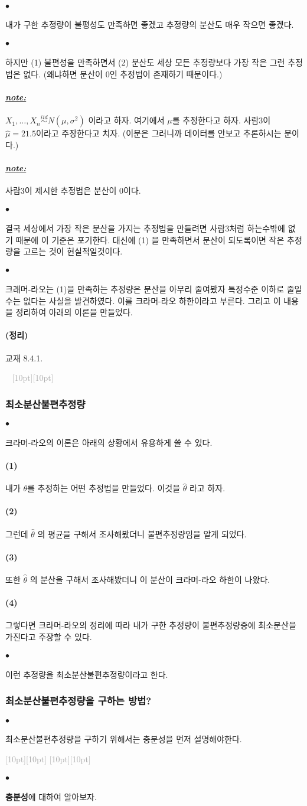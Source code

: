 \documentclass[12pt,oneside,english]{book}
\newcommand{\dash}{\vspace{2em}\noindent \textcolor{darkgray}{\hrulefill~ \raisebox{-2.5pt}[10pt][10pt]{\leafright \decofourleft \decothreeleft  \aldineright \decotwo \floweroneleft \decoone   \floweroneright \decotwo \aldineleft\decothreeright \decofourright \leafleft} ~  \hrulefill \\ \vspace{2em}}}
\newcommand{\rdash}{\noindent \textcolor{darkgray}{ \raisebox{-1.9pt}[10pt][10pt]{\leafright} \hrulefill \raisebox{-1.9pt}[10pt][10pt]{\leafright \decofourleft \decothreeleft  \aldineright \decotwo \floweroneleft \decoone}}}
\def\ck{\paragraph{\Large$\bullet$}\Large}
\def\thm{\paragraph{\Large(정리)}\Large}
\def\note{\paragraph{\Large\textit{\underline{note:}}}\Large}
\def\one{\paragraph{\Large(1)}\Large}
\def\two{\paragraph{\Large(2)}\Large}
\def\three{\paragraph{\Large(3)}\Large}
\def\four{\paragraph{\Large(4)}\Large}
\begin{document}
\ck 내가 구한 추정량이 불평성도 만족하면 좋겠고 추정량의 분산도 매우 작으면 좋겠다. 

\ck 하지만 (1) 불편성을 만족하면서 (2) 분산도 세상 모든 추정량보다 가장 작은 그런 추정법은 없다. (왜냐하면 분산이 0인 추정법이 존재하기 때문이다.)

\note $X_1,\dots,X_n \overset{iid}{\sim} N(\mu,\sigma^2)$ 이라고 하자. 여기에서 $\mu$를 추정한다고 하자. 사람3이 $\hat{\mu}=21.5$이라고 주장한다고 치자. (이분은 그러니까 데이터를 안보고 추론하시는 분이다.)

\note 사람3이 제시한 추정법은 분산이 0이다. 

\ck 결국 세상에서 가장 작은 분산을 가지는 추정법을 만들려면 사람3처럼 하는수밖에 없기 때문에 이 기준은 포기한다. 대신에 (1) 을 만족하면서 분산이 되도록이면 작은 추정량을 고르는 것이 현실적일것이다. 

\ck 크래머-라오는 (1)을 만족하는 추정량은 분산을 아무리 줄여봤자 특정수준 이하로 줄일수는 없다는 사실을 발견하였다. 이를 크라머-라오 하한이라고 부른다. 그리고 이 내용을 정리하여 아래의 이론을 만들었다. 

\thm 교재 8.4.1. 

\dash 

\subsubsection{최소분산불편추정량}

\ck 크라머-라오의 이론은 아래의 상황에서 유용하게 쓸 수 있다. 

\one 내가 $\theta$를 추정하는 어떤 추정법을 만들었다. 이것을 $\hat\theta$ 라고 하자. 
\two 그런데 $\hat\theta$ 의 평균을 구해서 조사해봤더니 불편추정량임을 알게 되었다. 
\three 또한 $\hat\theta$ 의 분산을 구해서 조사해봤더니 이 분산이 크라머-라오 하한이 나왔다. 
\four 그렇다면 크라머-라오의 정리에 따라 내가 구한 추정량이 불편추정량중에 최소분산을 가진다고 주장할 수 있다. 

\ck 이런 추정량을 최소분산불편추정량이라고 한다. 


\subsubsection{최소분산불편추정량을 구하는 방법?}

\ck 최소분산불편추정량을 구하기 위해서는 충분성을 먼저 설명해야한다. 

\rdash 

\ck \textbf{충분성}에 대하여 알아보자. 
\end{document}
